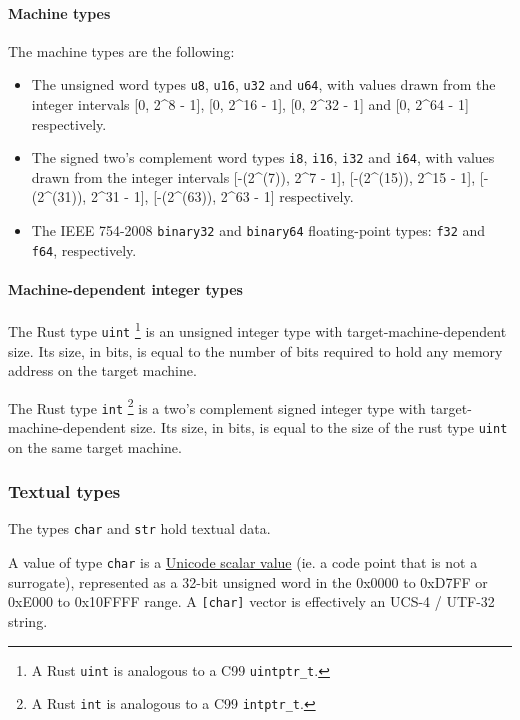 \documentclass[]{article}
\begin{document}
\paragraph{Machine types}\label{machine-types}

The machine types are the following:

\begin{itemize}
\item
  The unsigned word types \texttt{u8}, \texttt{u16}, \texttt{u32} and
  \texttt{u64}, with values drawn from the integer intervals {[}0,
  2\^{}8 - 1{]}, {[}0, 2\^{}16 - 1{]}, {[}0, 2\^{}32 - 1{]} and {[}0,
  2\^{}64 - 1{]} respectively.
\item
  The signed two's complement word types \texttt{i8}, \texttt{i16},
  \texttt{i32} and \texttt{i64}, with values drawn from the integer
  intervals {[}-(2\^{}(7)), 2\^{}7 - 1{]}, {[}-(2\^{}(15)), 2\^{}15 -
  1{]}, {[}-(2\^{}(31)), 2\^{}31 - 1{]}, {[}-(2\^{}(63)), 2\^{}63 - 1{]}
  respectively.
\item
  The IEEE 754-2008 \texttt{binary32} and \texttt{binary64}
  floating-point types: \texttt{f32} and \texttt{f64}, respectively.
\end{itemize}

\paragraph{Machine-dependent integer
types}\label{machine-dependent-integer-types}

The Rust type \texttt{uint} \footnote{A Rust \texttt{uint} is analogous
  to a C99 \texttt{uintptr\_t}.} is an unsigned integer type with
target-machine-dependent size. Its size, in bits, is equal to the number
of bits required to hold any memory address on the target machine.

The Rust type \texttt{int} \footnote{A Rust \texttt{int} is analogous to
  a C99 \texttt{intptr\_t}.} is a two's complement signed integer type
with target-machine-dependent size. Its size, in bits, is equal to the
size of the rust type \texttt{uint} on the same target machine.

\subsubsection{Textual types}\label{textual-types}

The types \texttt{char} and \texttt{str} hold textual data.

A value of type \texttt{char} is a
\href{http://www.unicode.org/glossary/\#unicode_scalar_value}{Unicode
scalar value} (ie. a code point that is not a surrogate), represented as
a 32-bit unsigned word in the 0x0000 to 0xD7FF or 0xE000 to 0x10FFFF
range. A \texttt{{[}char{]}} vector is effectively an UCS-4 / UTF-32
string.
\end{document}
